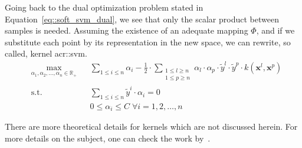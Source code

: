                 Going back to the dual optimization problem stated in Equation~\ref{eq::soft_svm_dual}, we see that only the scalar product between samples is needed.
                Assuming the existence of an adequate mapping $\Phi$, and if we substitute each point by its representation in the new space, we can rewrite, so called, kernel \gls{acr::svm}.
                \begin{equation}
                    \label{eq::kernel_soft_svm_dual}
                    \begin{aligned}
                        & \max_{\alpha_1, \alpha_2, \dots, \alpha_n \in \mathbb{R}_+}
                        & & \sum_{1 \leq i \leq n} \alpha_i - \frac{1}{2}\cdot\sum_{\substack{1\leq l \geq n\\1\leq p \geq n}}\alpha_l\cdot\alpha_p\cdot\tilde{y}^l\cdot\tilde{y}^p\cdot k(\bm{x}^l, \bm{x}^p)\\
                        &\text{s.t.} & & \sum_{1 \leq i \leq n}\tilde{y}^i\cdot\alpha_i=0 \\
                        & & & 0 \leq \alpha_i \leq C \; \forall i=1,2,\dots,n
                        \end{aligned}
                \end{equation}

                There are more theoretical details for kernels which are not discussed herein.
                For more details on the subject, one can check the work by~\textcite{aronszajn1950theory,shawe2004kernel,vapnik2013nature}.

